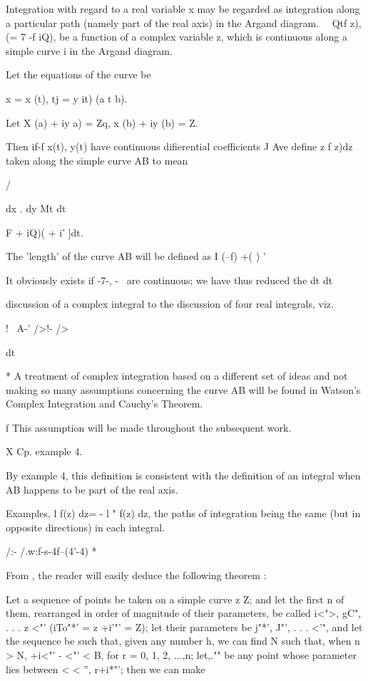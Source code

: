 
Integration with regard to a real variable x may be regarded as
integration along a particular path (namely part of the real axis) in
the Argand diagram. \ \ Qtf z), (= 7 -f iQ), be a function of a
complex variable z, which is continuous along a simple curve i in the
Argand diagram.

Let the equations of the curve be

x = x (t), tj = y it) (a t b).

Let X (a) + iy a) = Zq, x (b) + iy (b) = Z.

Then if-f x(t), y(t) have continuous difierential coefficients J Ave
define z f z)dz taken along the simple curve AB to mean

/

dx . dy Mt dt

 F + iQ)( + i' ]dt.

The 'length' of the curve AB will be defined as I \/ (--f) +( ) '

It obviously exists if -7-, -~ are continuous; we have thus reduced
the  dt dt

discussion of a complex integral to the discussion of four real
integrals, viz.

! \ A-' />!- />

dt

* A treatment of complex integration based on a different set of ideas
and not making so many assumptions concerning the curve AB will be
found in Watson's Complex Integration and Cauchy's Theorem.

f This assumption will be made throughout the subsequent work.

X Cp. example 4.

%
%

By  example 4, this definition is consistent with the definition
of an integral when AB happens to be part of the real axis.

Examples, l f(z) dz= - l " f(z) dz, the paths of integration being the
same (but in opposite directions) in each integral.

/:- /.w:f-s-4f--(4'-4) *\


From , the reader will easily deduce the following theorem :

Let a sequence of points be taken on a simple curve z Z; and let the
first n of them, rearranged in order of magnitude of their parameters,
be called i<">, gC", . . . z <"' (iTo"*' = z +i'"' = Z); let their
parameters be j"*', J"', . . . <'", and let the sequence be such that,
given any number h, we can find N such that, when n > N, +i<"' - <"' <
B, for r = 0, 1, 2, ...,n; let,."" be any point whose parameter lies
between < < '', r+i*"'; then we can make

